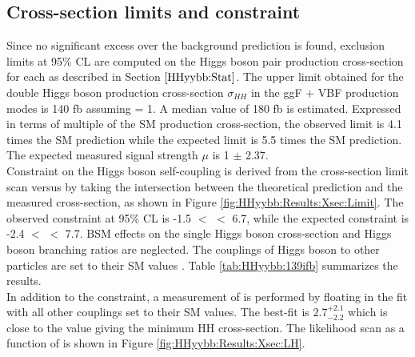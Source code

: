 \subsection{Cross-section limits and \kl constraint}
\label{HHyybb:Results:Xsec}
 Since no significant excess over the background prediction is found, exclusion limits at 95\% CL are computed on the Higgs boson pair production cross-section for each \kl as described in Section $\ref{HHyybb:Stat}$. The upper limit obtained for the double Higgs boson production cross-section $\sigma_{HH}$ in the ggF + VBF production modes is 140 fb assuming \kl = 1. A median value of 180 fb is estimated. Expressed in terms of multiple of the SM production cross-section, the observed limit is 4.1 times the SM prediction while the expected limit is 5.5 times the SM prediction. The expected measured signal strength $\mu$ is 1 $\pm$ 2.37.\\

Constraint on the Higgs boson self-coupling is derived from the cross-section limit scan versus \kl by taking the intersection between the theoretical prediction and the measured cross-section, as shown in Figure \ref{fig:HHyybb:Results:Xsec:Limit}. The observed constraint at 95\% CL is -1.5 $<$ \kl $<$ 6.7, while the expected constraint is -2.4 $<$ \kl $<$ 7.7. BSM effects on the single Higgs boson cross-section and Higgs boson branching ratios are neglected. The couplings of Higgs boson to other particles are set to their SM values \cite{Higgs_80ifb}. Table \ref{tab:HHyybb:139ifb} summarizes the results. \\
In addition to the constraint, a measurement of \kl is performed by floating \kl in the fit with all other couplings set to their SM values. The best-fit \kl is $2.7^{+2.1}_{-2.2}$ which is close  to the \kl value giving the minimum HH cross-section. The likelihood scan as a function of \kl is shown in Figure \ref{fig:HHyybb:Results:Xsec:LH}.

